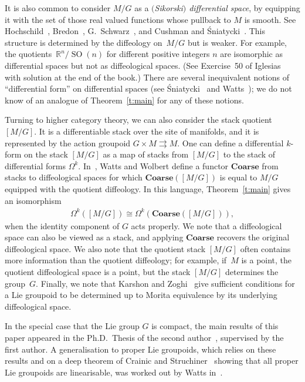 \documentclass[pdftex]{sigma}
\numberwithin{equation}{section}
\newcommand{\RR}{{\mathbb{R}}} %
\newcommand{\SO}{{\operatorname{SO}}} %
\newcommand{\toto}{{\rightrightarrows}}
\newcommand{\hypref}[2]{{#2~\ref{#1}}}
\begin{document}
It is also common to consider $M/G$ as a \emph{$($Sikorski$)$ differential space},
by equipping it with the set of those real valued functions
whose pullback to $M$ is smooth.
See Hochschild~\cite{hochschild}, Bredon~\cite{bredon},
G.~Schwarz~\cite{schwarz}, and Cushman and \'Sniatycki~\cite{CuSn}.
This structure is determined by the dif\/feology on~$M/G$ but is weaker.
For example, the quotients~$\RR^n/\SO(n)$
for dif\/ferent positive integers $n$ are isomorphic as dif\/ferential spaces
but not as dif\/feological spaces.
(See Exercise~50 of Iglesias~\cite{iglesias}
with solution at the end of the book.)
There are several inequivalent notions of ``dif\/ferential form''
on dif\/ferential spaces
(see \'Sniatycki~\cite{sniatycki} and Watts~\cite{watts-masters});
we do not know of an analogue of \hypref{t:main}{Theorem}
for any of these notions.

Turning to higher category theory,
we can also consider the stack quotient $[M/G]$.
It is a dif\/ferentiable stack over the site of manifolds,
and it is represented by the action groupoid $G\times M\toto M$.
One can def\/ine a dif\/ferential $k$-form on the stack $[M/G]$
as a map of stacks from $[M/G]$
to the stack of dif\/ferential forms $\Omega^k$.
In~\cite{WW},
Watts and Wolbert def\/ine a functor $\mathbf{Coarse}$ from stacks
to dif\/feological spaces for
which $\mathbf{Coarse}([M/G])$ is equal to $M/G$ equipped with the
quotient dif\/feology. In this language,
\hypref{t:main}{Theorem} gives an isomorphism
\begin{gather*} \Omega^k([M/G])\cong \Omega^k(\mathbf{Coarse}([M/G])), \end{gather*}
when the identity component of $G$ acts properly.
We note that
a dif\/feological space can also be viewed as a stack,
and applying $\mathbf{Coarse}$ recovers the original dif\/feological space.
We also note that
the quotient stack $[M/G]$ often contains more information than
the quotient dif\/feology;
for example, if~$M$ is a point, the quotient dif\/feological space is a point,
but the stack $[M/G]$ determines the group~$G$.
Finally, we note that
Karshon and Zoghi~\cite{zoghi} give suf\/f\/icient conditions
for a Lie groupoid to be determined up to Morita equivalence
by its underlying dif\/feological space.

In the special case that the Lie group $G$ is compact,
the main results of this paper appeared in the Ph.D.\ Thesis of the
second author~\cite{watts}, supervised by the f\/irst author.
A generalisation to proper Lie groupoids, which relies on these results and on
a deep theorem of Crainic and Struchiner~\cite{CrSt}
showing that all proper Lie groupoids are linearisable,
was worked out by Watts in~\cite{watts-groupoids}.
\end{document}
